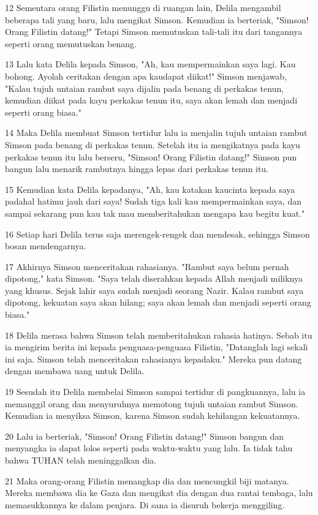 \par 12 Sementara orang Filistin menunggu di ruangan lain, Delila mengambil beberapa tali yang baru, lalu mengikat Simson. Kemudian ia berteriak, "Simson! Orang Filistin datang!" Tetapi Simson memutuskan tali-tali itu dari tangannya seperti orang memutuskan benang.
\par 13 Lalu kata Delila kepada Simson, "Ah, kau mempermainkan saya lagi. Kau bohong. Ayolah ceritakan dengan apa kaudapat diikat!" Simson menjawab, "Kalau tujuh untaian rambut saya dijalin pada benang di perkakas tenun, kemudian diikat pada kayu perkakas tenun itu, saya akan lemah dan menjadi seperti orang biasa."
\par 14 Maka Delila membuat Simson tertidur lalu ia menjalin tujuh untaian rambut Simson pada benang di perkakas tenun. Setelah itu ia mengikatnya pada kayu perkakas tenun itu lalu berseru, "Simson! Orang Filistin datang!" Simson pun bangun lalu menarik rambutnya hingga lepas dari perkakas tenun itu.
\par 15 Kemudian kata Delila kepadanya, "Ah, kau katakan kaucinta kepada saya padahal hatimu jauh dari saya! Sudah tiga kali kau mempermainkan saya, dan sampai sekarang pun kau tak mau memberitahukan mengapa kau begitu kuat."
\par 16 Setiap hari Delila terus saja merengek-rengek dan mendesak, sehingga Simson bosan mendengarnya.
\par 17 Akhirnya Simson menceritakan rahasianya. "Rambut saya belum pernah dipotong," kata Simson. "Saya telah diserahkan kepada Allah menjadi miliknya yang khusus. Sejak lahir saya sudah menjadi seorang Nazir. Kalau rambut saya dipotong, kekuatan saya akan hilang; saya akan lemah dan menjadi seperti orang biasa."
\par 18 Delila merasa bahwa Simson telah memberitahukan rahasia hatinya. Sebab itu ia mengirim berita ini kepada penguasa-penguasa Filistin, "Datanglah lagi sekali ini saja. Simson telah menceritakan rahasianya kepadaku." Mereka pun datang dengan membawa uang untuk Delila.
\par 19 Sesudah itu Delila membelai Simson sampai tertidur di pangkuannya, lalu ia memanggil orang dan menyuruhnya memotong tujuh untaian rambut Simson. Kemudian ia menyiksa Simson, karena Simson sudah kehilangan kekuatannya.
\par 20 Lalu ia berteriak, "Simson! Orang Filistin datang!" Simson bangun dan menyangka ia dapat lolos seperti pada waktu-waktu yang lalu. Ia tidak tahu bahwa TUHAN telah meninggalkan dia.
\par 21 Maka orang-orang Filistin menangkap dia dan mencungkil biji matanya. Mereka membawa dia ke Gaza dan mengikat dia dengan dua rantai tembaga, lalu memasukkannya ke dalam penjara. Di sana ia disuruh bekerja menggiling.
